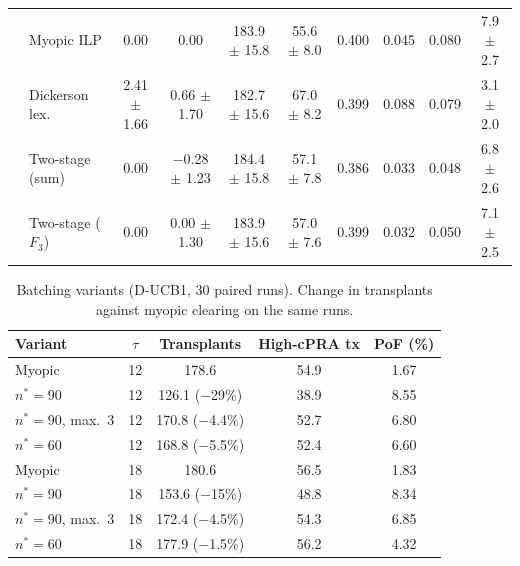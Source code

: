 \begin{table}[!t]
\begin{tabular}{@{}cl cccccccc@{}}
 & Myopic ILP         & 0.00            & 0.00              & 183.9 $\pm$ 15.8 & 55.6 $\pm$ 8.0 & 0.400 & 0.045 & 0.080 & 7.9 $\pm$ 2.7 \\
 & Dickerson lex.     & 2.41 $\pm$ 1.66 & 0.66 $\pm$ 1.70   & 182.7 $\pm$ 15.6 & 67.0 $\pm$ 8.2 & 0.399 & 0.088 & 0.079 & 3.1 $\pm$ 2.0 \\
 & Two-stage (sum)    & 0.00            & $-$0.28 $\pm$ 1.23 & 184.4 $\pm$ 15.8 & 57.1 $\pm$ 7.8 & 0.386 & 0.033 & 0.048 & 6.8 $\pm$ 2.6 \\
 & Two-stage ($F_3$)  & 0.00            & 0.00 $\pm$ 1.30   & 183.9 $\pm$ 15.6 & 57.0 $\pm$ 7.6 & 0.399 & 0.032 & 0.050 & 7.1 $\pm$ 2.5 \\
\bottomrule
\end{tabular}
\end{table}

\begin{table}[!t]
\centering
\caption{Batching variants (D-UCB1, 30 paired runs). Change in
transplants against myopic clearing on the same runs.}
\label{tab:batch}
\footnotesize
\setlength{\tabcolsep}{3pt}
\begin{tabular}{@{}lcccc@{}}
\toprule
Variant & $\tau$ & Transplants & High-cPRA tx & PoF (\%) \\
\midrule
Myopic                  & 12 & 178.6           & 54.9 & 1.67 \\
$n^* = 90$              & 12 & 126.1 ($-$29\%) & 38.9 & 8.55 \\
$n^* = 90$, max.\ 3     & 12 & 170.8 ($-$4.4\%) & 52.7 & 6.80 \\
$n^* = 60$              & 12 & 168.8 ($-$5.5\%) & 52.4 & 6.60 \\
\midrule
Myopic                  & 18 & 180.6           & 56.5 & 1.83 \\
$n^* = 90$              & 18 & 153.6 ($-$15\%) & 48.8 & 8.34 \\
$n^* = 90$, max.\ 3     & 18 & 172.4 ($-$4.5\%) & 54.3 & 6.85 \\
$n^* = 60$              & 18 & 177.9 ($-$1.5\%) & 56.2 & 4.32 \\
\bottomrule
\end{tabular}
\end{table}

